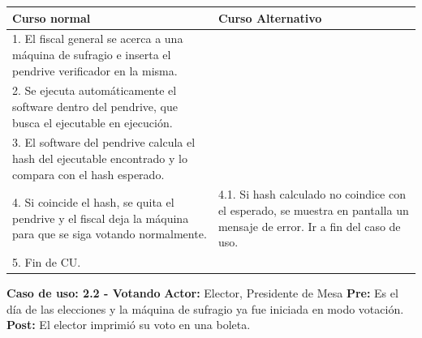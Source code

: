 \begin{table}[h!]
	
 \begin{tabular}{|p{7.5cm} | p{7.5cm}|} 
 \hline
 \textbf{Curso normal} & \textbf{Curso Alternativo} \\
 \hline
	

1. El fiscal general se acerca a una máquina de sufragio e inserta el pendrive verificador en la misma. & \\
 \hline
2. Se ejecuta automáticamente el software dentro del pendrive, que busca el ejecutable en ejecución.& \\


3. El software del pendrive calcula el hash del ejecutable encontrado y lo compara con el hash esperado. & \\
\hline

4. Si coincide el hash, se quita el pendrive y el fiscal deja la máquina para que se siga votando normalmente. &
4.1. Si hash calculado no coindice con el esperado, se muestra en pantalla un mensaje de error. Ir a fin del caso de uso. \\
\hline
5. Fin de CU. & \\
\hline
\end{tabular}
\end{table}

\textbf{Caso de uso: 2.2 - Votando}
\textbf{Actor:} Elector, Presidente de Mesa
\textbf{Pre:} Es el día de las elecciones y la máquina de sufragio ya fue iniciada en modo votación.
\textbf{Post:} El elector imprimió su voto en una boleta.

